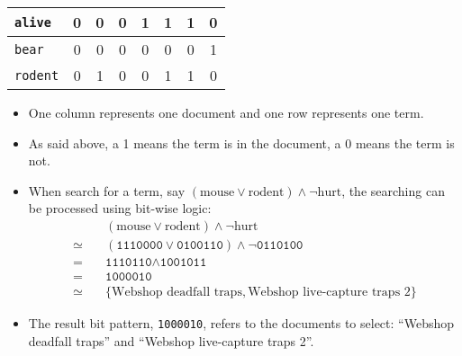 \documentclass[a4paper, 11pt, accentcolor = tud3b]{tudreport}
\begin{document}
\begin{table}[H]
\begin{tabular}{|l|c|c|c|c|c|c|c|}
            			\texttt{alive}  & \textcolor{irl}{0} & \textcolor{irl}{0} & \textcolor{irl}{0} &         1          &         1          &         1          & \textcolor{irl}{0} \\ \hline
            			\texttt{bear}   & \textcolor{irl}{0} & \textcolor{irl}{0} & \textcolor{irl}{0} & \textcolor{irl}{0} & \textcolor{irl}{0} & \textcolor{irl}{0} &         1          \\ \hline
            			\texttt{rodent} & \textcolor{irl}{0} &         1          & \textcolor{irl}{0} & \textcolor{irl}{0} &         1          &         1          & \textcolor{irl}{0} \\ \hline
            		\end{tabular}
            	\end{table}
	            \begin{itemize}
	            	\item One column represents one document and one row represents one term.
	            	\item As said above, a 1 means the term is in the document, a 0 means the term is not.
	            	\item When search for a term, say \( (\text{mouse} \lor \text{rodent}) \land \lnot\text{hurt} \), the searching can be processed using bit-wise logic:
	            		\begin{align*}
		            		       & \quad (\text{mouse} \lor \text{rodent}) \land \lnot\text{hurt} \\
		            		\simeq & \quad (\texttt{1110000} \lor \texttt{0100110}) \land \lnot\texttt{0110100} \\
		            		     = & \quad \texttt{1110110} \land \texttt{1001011} \\
		            		     = & \quad \texttt{1000010} \\
		            		\simeq & \quad \{ \text{Webshop deadfall traps}, \text{Webshop live-capture traps 2} \}
	            		\end{align*}
	            	\item The result bit pattern, \texttt{1000010}, refers to the documents to select: \enquote{Webshop deadfall traps} and \enquote{Webshop live-capture traps 2}.
	            \end{itemize}
\end{document}
